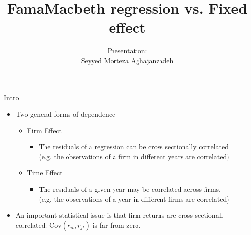 \documentclass{beamer}
\title[FamaMacbeth regression vs. Fixed effect]{FamaMacbeth regression vs. Fixed effect}
\author[S.M.Aghajanzadeh]{Presentation:  \\ Seyyed Morteza Aghajanzadeh}
\institute[TeIAS]{Tehran Institute for Advanced Studies \\ TeIAS}
\begin{document}
\maketitle

\begin{frame}{Intro}
\begin{itemize}
\item  Two general forms of dependence
\begin{itemize}
\item {Firm Effect} 
\begin{itemize}
\item The residuals of a regression can be cross sectionally
correlated\\
 (e.g. the observations of a firm in different years are correlated)
\end{itemize}

\item {Time Effect}
\begin{itemize}
\item  The residuals of a given year may be correlated across firms.
\\
 (e.g. the observations of a year in different firms are correlated)
\end{itemize}


\end{itemize}
\item  An important statistical issue is that firm returns are cross-sectionall correlated: $ \text{Cov}(r_{it},r_{jt}) $ is far from zero.
\end{itemize}
\end{frame}
\end{document}
